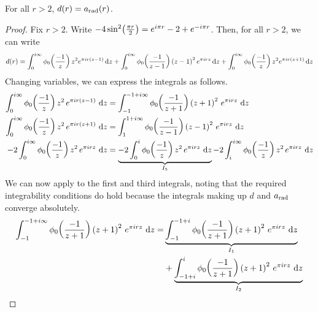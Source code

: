 \begin{boxproposition}\label{Ch4:Prop:a_eq_d}
    For all $r > 2$, $d(r) = a_{\operatorname{rad}}(r)$.
\end{boxproposition}
\begin{proof}
    Fix $r > 2$. Write $-4 \sin^2\!\left( \frac{\pi r}{2} \right) = e^{i \pi r} - 2 + e^{-i \pi r}$. Then, for all $r > 2$, we can write
    \begin{align} \small
         d(r)
         =
         \int_{0}^{i \infty} \phi_0\!\left( \frac{-1}{z} \right) z^2 e^{\pi i r \left( z - 1 \right)} \operatorname{d}\!{z}
         +
         \int_{0}^{i \infty} \phi_0\!\left( \frac{-1}{z - 1} \right) \left( z - 1 \right)^2 e^{\pi i r z} \operatorname{d}\!{z}
         +
         \int_{0}^{i \infty} \phi_0\!\left( \frac{-1}{z} \right) z^2 e^{\pi i r \left( z + 1 \right)} \operatorname{d}\!{z}
         \label{Ch4:Eq:d_after_sinsq_trick}
    \end{align}
    Changing variables, we can express the integrals as follows.
    \begin{align*}
        \int_{0}^{i \infty} \phi_0\of{\frac{-1}{z}} z^2 \, e^{\pi i r \parenth{z - 1}} \, \diff{z}
        &=
        \int_{-1}^{-1 + i \infty} \phi_0\of{\frac{-1}{z + 1}} \parenth{z + 1}^2 \, e^{\pi i r z} \, \diff{z} \\
        \int_{0}^{i \infty} \phi_0\of{\frac{-1}{z}} z^2 \, e^{\pi i r \parenth{z + 1}} \, \diff{z}
        &=
        \int_{1}^{1 + i \infty} \phi_0\of{\frac{-1}{z - 1}} \parenth{z - 1}^2 \, e^{\pi i r z} \, \diff{z} \\
        -2 \int_{0}^{i \infty} \phi_0\of{\frac{-1}{z}} z^2 \, e^{\pi i r z} \, \diff{z}
        &=
        \underbrace{-2 \int_{0}^{i} \phi_0\of{\frac{-1}{z}} z^2 \, e^{\pi i r z} \, \diff{z}}_{I_5}
        -2 \int_{i}^{i \infty} \phi_0\of{\frac{-1}{z}} z^2 \, e^{\pi i r z} \, \diff{z} %
    \end{align*}
    We can now apply  to the first and third integrals, noting that the required integrability conditions do hold because the integrals making up $d$ and $a_{\operatorname{rad}}$ converge absolutely.
    \begin{align*}
        \int_{-1}^{-1 + i \infty} \phi_0\of{\frac{-1}{z + 1}} \parenth{z + 1}^2 \, e^{\pi i r z} \, \diff{z}
        =& \underbrace{\int_{-1}^{-1 + i} \phi_0\of{\frac{-1}{z + 1}} \parenth{z + 1}^2 \, e^{\pi i r z} \, \diff{z}}_{I_1} \\
        &+ \underbrace{\int_{-1 + i}^{i} \phi_0\of{\frac{-1}{z + 1}} \parenth{z + 1}^2 \, e^{\pi i r z} \, \diff{z}}_{I_2} \\

\end{align*}
\end{proof}

